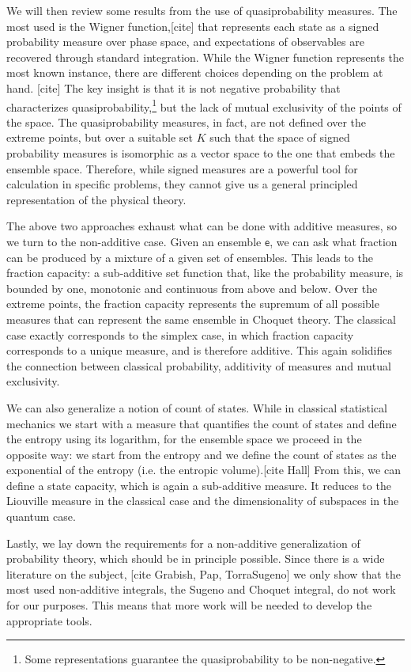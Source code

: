 \documentclass[10pt,twocolumn, nofootinbib]{revtex4-2}
\newcommand{\ens}[1][e] {\mathsf{#1}} %
\begin{document}
We will then review some results from the use of quasiprobability measures. The most used is the Wigner function,[cite] that represents each state as a signed probability measure over phase space, and expectations of observables are recovered through standard integration. While the Wigner function represents the most known instance, there are different choices depending on the problem at hand\cite{cahill1969}. [cite] The key insight is that it is not negative probability that characterizes quasiprobability,\footnote{Some representations guarantee the quasiprobability to be non-negative.} but the lack of mutual exclusivity of the points of the space. The quasiprobability measures, in fact, are not defined over the extreme points, but over a suitable set $K$ such that the space of signed probability measures is isomorphic as a vector space to the one that embeds the ensemble space. Therefore, while signed measures are a powerful tool for calculation in specific problems, they cannot give us a general principled representation of the physical theory.

The above two approaches exhaust what can be done with additive measures, so we turn to the non-additive case. Given an ensemble $\ens$, we can ask what fraction can be produced by a mixture of a given set of ensembles. This leads to the fraction capacity: a sub-additive set function that, like the probability measure, is bounded by one, monotonic and continuous from above and below. Over the extreme points, the fraction capacity represents the supremum of all possible measures that can represent the same ensemble in Choquet theory. The classical case exactly corresponds to the simplex case, in which fraction capacity corresponds to a unique measure, and is therefore additive. This again solidifies the connection between classical probability, additivity of measures and mutual exclusivity.

We can also generalize a notion of count of states. While in classical statistical mechanics we start with a measure that quantifies the count of states and define the entropy using its logarithm, for the ensemble space we proceed in the opposite way: we start from the entropy and we define the count of states as the exponential of the entropy (i.e. the entropic volume).[cite Hall] From this, we can define a state capacity, which is again a sub-additive measure. It reduces to the Liouville measure in the classical case and the dimensionality of subspaces in the quantum case.

Lastly, we lay down the requirements for a non-additive generalization of probability theory, which should be in principle possible. Since there is a wide literature on the subject, [cite Grabish, Pap, TorraSugeno] we only show that the most used non-additive integrals, the Sugeno and Choquet integral, do not work for our purposes. This means that more work will be needed to develop the appropriate tools.
\end{document}
